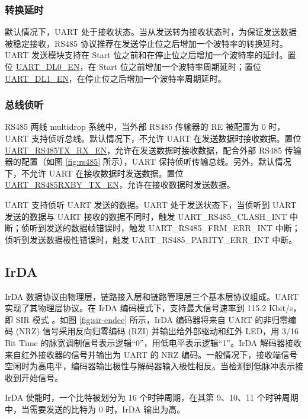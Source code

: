 \documentclass[main\_\_CN.tex]{subfiles}
\begin{document}
\subsubsection{转换延时}\label{sec:uart-turnaround-delay}

默认情况下，UART 处于接收状态。当从发送转为接收状态时，为保证发送数据被稳定接收，RS485 协议推荐在发送停止位之后增加一个波特率的转换延时。UART 发送模块支持在 Start 位之前和在停止位之后增加一个波特率的延时。置位 \hyperref[fielddesc:UARTDL0EN]{UART\_DL0\_EN}，在 Start 位之前增加一个波特率周期延时；置位 \hyperref[fielddesc:UARTDL1EN]{UART\_DL1\_EN}，在停止位之后增加一个波特率周期延时。

\subsubsection{总线侦听}

RS485 两线 multidrop 系统中，当外部 RS485 传输器的 RE 被配置为 0 时，UART 支持侦听总线。默认情况下，不允许 UART 在发送数据时接收数据。置位 \hyperref[fielddesc:UARTRS485TXRXEN]{UART\_RS485TX\_RX\_EN}，允许在发送数据时接收数据，配合外部 RS485 传输器的配置（如图 \ref{fig:rs485} 所示），UART 保持侦听传输总线。另外，默认情况下，不允许 UART 在接收数据时发送数据。置位 \hyperref[fielddesc:UARTRS485RXBYTXEN]{UART\_RS485RXBY\_TX\_EN}，允许在接收数据时发送数据。

UART 支持侦听 UART 发送的数据。UART 处于发送状态下，当侦听到 UART 发送的数据与 UART 接收的数据不同时，触发 UART\_RS485\_CLASH\_INT 中断；侦听到发送的数据帧错误时，触发 UART\_RS485\_FRM\_ERR\_INT 中断；侦听到发送数据极性错误时，触发 UART\_RS485\_PARITY\_ERR\_INT 中断。

\subsection{IrDA} \label{sub:uart-func-desc-irda}

IrDA 数据协议由物理层，链路接入层和链路管理层三个基本层协议组成。UART 实现了其物理层协议。在 IrDA 编码模式下，支持最大信号速率到 115.2 Kbit/s，即 SIR 模式 。如图 \ref{fig:sir-endec} 所示，IrDA 编码器将来自 UART 的非归零编码 (NRZ) 信号采用反向归零编码 (RZI) 并输出给外部驱动和红外 LED，用 3/16 Bit Time 的脉宽调制信号表示逻辑“0”，用低电平表示逻辑“1”。IrDA 解码器接收来自红外接收器的信号并输出为 UART 的 NRZ 编码。一般情况下，接收端信号空闲时为高电平，编码器输出极性与解码器输入极性相反。当检测到低脉冲表示接收到开始信号。

IrDA 使能时，一个比特被划分为 16 个时钟周期，在其第 9、10、11 个时钟周期中，当需要发送的比特为 0 时，IrDA 输出为高。
\end{document}

